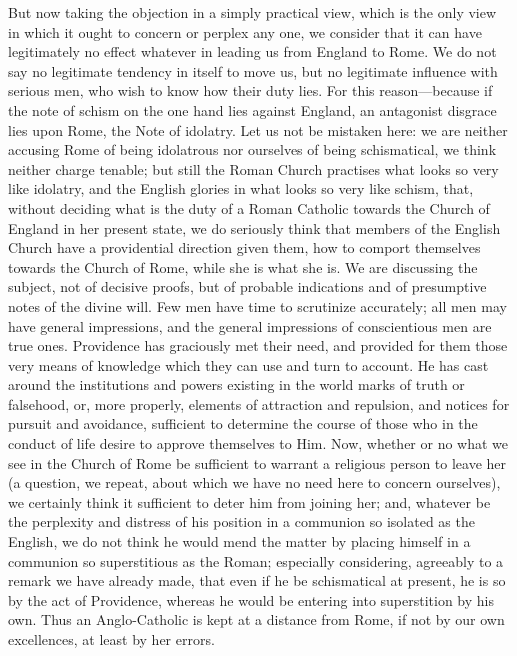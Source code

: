 But now taking the objection in a simply practical view, which is
the only view in which it ought to concern or perplex any one, we
consider that it can have legitimately no effect whatever in leading
us from England to Rome. We do not say no legitimate tendency in
itself to move us, but no legitimate influence with serious men, who
wish to know how their duty lies. For this reason—because if the
note of schism on the one hand lies against England, an antagonist
disgrace lies upon Rome, the Note of idolatry. Let us not be mistaken
here: we are neither accusing Rome of being idolatrous nor ourselves
of being schismatical, we think neither charge tenable; but still the
Roman Church practises what looks so very like idolatry, and the
English glories in what looks so very like schism, that, without
deciding what is the duty of a Roman Catholic towards the Church of
England in her present state, we do seriously think that members of
the English Church have a providential direction given them, how to
comport themselves towards the Church of Rome, while she is what she
is. We are discussing the subject, not of decisive proofs, but of
probable indications and of presumptive notes of the divine will. Few
men have time to scrutinize accurately; all men may have general
impressions, and the general impressions of conscientious men are true
ones. Providence has graciously met their need, and provided for them
those very means of knowledge which they can use and turn to account.
He has cast around the institutions and powers existing in the world
marks of truth or falsehood, or, more properly, elements of attraction
and repulsion, and notices for pursuit and avoidance, sufficient to
determine the course of those who in the conduct of life desire to
approve themselves to Him. Now, whether or no what we see in the
Church of Rome be sufficient to warrant a religious person to
leave her (a question, we repeat, about which we have no need here to
concern ourselves), we certainly think it sufficient to deter him from
joining her; and, whatever be the perplexity and distress of his
position in a communion so isolated as the English, we do not think he
would mend the matter by placing himself in a communion so
superstitious as the Roman; especially considering, agreeably to a
remark we have already made, that even if he be schismatical at
present, he is so by the act of Providence, whereas he would be
entering into superstition by his own. Thus an Anglo-Catholic is kept
at a distance from Rome, if not by our own excellences, at least by
her errors.

